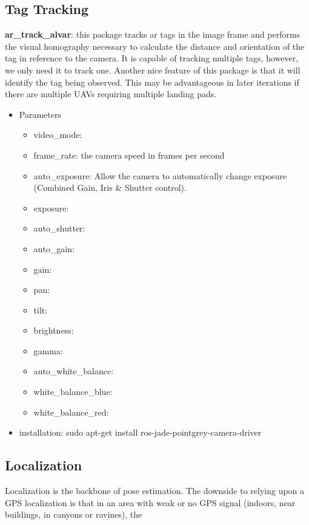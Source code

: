 \subsection{Tag Tracking}
\noindent \textbf{ar\_track\_alvar}: this package tracks ar tags in the image frame and performs the visual homography necessary to calculate the distance and orientation of the tag in reference to the camera. It is capable of tracking multiple tags, however, we only need it to track one. Another nice feature of this package is that it will identify the tag being observed. This may be advantageous in later iterations if there are multiple UAVs requiring multiple landing pads.



\begin{itemize}
\item Parameters
\begin{itemize}
\item video\_mode:
\item frame\_rate:  the camera speed in frames per second
\item auto\_exposure:  Allow the camera to automatically change exposure (Combined Gain, Iris \& Shutter control).
\item exposure: 
\item auto\_shutter:
\item auto\_gain:
\item gain:
\item pan:
\item tilt:
\item brightness:
\item gamma:
\item auto\_white\_balance:
\item white\_balance\_blue:
\item white\_balance\_red:
\end{itemize}
\item installation: sudo apt-get install ros-jade-pointgrey-camera-driver
\end{itemize}

\subsection{Localization}
Localization is the backbone of pose estimation. The downside to relying upon a GPS localization is that in an area with weak or no GPS signal (indoors, near buildings, in canyons or ravines), the 


